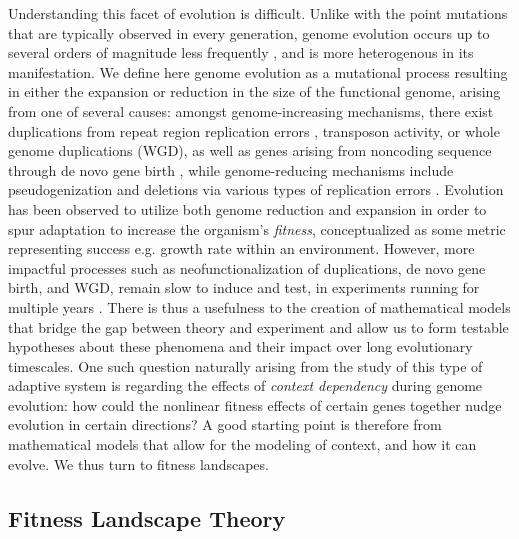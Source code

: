 \documentclass[paper=a4, fontsize=11pt,twoside]{scrartcl}       %
\begin{document}
Understanding this facet of evolution is difficult. Unlike with the point mutations that are typically observed in every generation, genome evolution occurs up to several orders of magnitude less frequently \cite{sousaRatesTranspositionEscherichia2013}\cite{lipinskiHighSpontaneousRate2011}, and is more heterogenous in its manifestation. We define here genome evolution as a mutational process resulting in either the expansion or reduction in the size of the functional genome, arising from one of several causes: amongst genome-increasing mechanisms, there exist duplications from repeat region replication errors \cite{reamsMechanismsGeneDuplication2015}, transposon activity, or whole genome duplications (WGD), as well as genes arising from noncoding sequence through de novo gene birth \cite{sacconeOriginEvolutionGenes2025}, while genome-reducing mechanisms include pseudogenization and deletions via various types of replication errors \cite{burssedMechanismsStructuralChromosomal2022}. Evolution has been observed to utilize both genome reduction \cite{helsenGeneLossPredictably2020}\cite{szameczGenomicLandscapeCompensatory2014} and expansion \cite{vossebergTimingOriginEukaryotic2021} in order to spur adaptation to increase the organism's \textit{fitness}, conceptualized as some metric representing success e.g. growth rate within an environment. However, more impactful processes such as neofunctionalization of duplications, de novo gene birth, and WGD, remain slow to induce and test, in experiments running for multiple years \cite{tongGenomeDuplicationLongterm2025}. There is thus a usefulness to the creation of mathematical models that bridge the gap between theory and experiment and allow us to form testable hypotheses about these phenomena and their impact over long evolutionary timescales. One such question naturally arising from the study of this type of adaptive system is regarding the effects of \textit{context dependency} during genome evolution: how could the nonlinear fitness effects of certain genes together nudge evolution in certain directions? A good starting point is therefore from mathematical models that allow for the modeling of context, and how it can evolve. We thus turn to fitness landscapes.

\subsection*{Fitness Landscape Theory}
\end{document}
